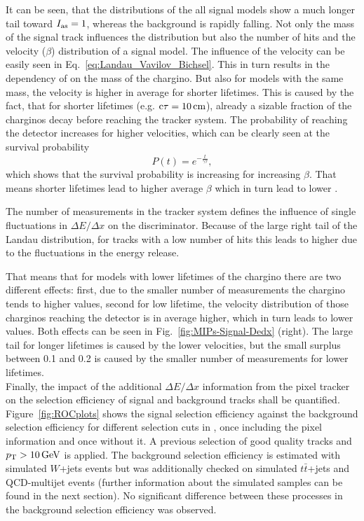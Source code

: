 It can be seen, that the \ias distributions of the all signal models show a much longer tail toward $I_{\text{as}}=1$, whereas the background is rapidly falling.
Not only the mass of the signal track influences the \ias distribution but also the number of hits and the velocity ($\beta$) distribution of a signal model.
The influence of the velocity can be easily seen in Eq.~\ref{eq:Landau_Vavilov_Bichsel}. 
This in turn results in the dependency of \ias on the mass of the chargino.
But also for models with the same mass, the velocity is higher in average for shorter lifetimes.
This is caused by the fact, that for shorter lifetimes (e.g. $\text{c}\tau=10\,\text{cm}$), already a sizable fraction of the charginos decay before reaching the tracker system.
The probability of reaching the detector increases for higher velocities, which can be clearly seen at the survival probability
\begin{equation}
P \left( t \right) = e^{-\frac{t}{\gamma \tau}},
\end{equation} 
which shows that the survival probability is increasing for increasing $\beta$. 
That means shorter lifetimes lead to higher average $\beta$ which in turn lead to lower \ias.

The number of measurements in the tracker system defines the influence of single fluctuations in $\Delta E/\Delta x$ on the \ias discriminator. 
Because of the large right tail of the Landau distribution, for tracks with a low number of hits this leads to higher \ias due to the  fluctuations in the energy release.

That means that for models with lower lifetimes of the chargino there are two different effects: 
first, due to the smaller number of measurements the chargino tends to higher \ias values, 
second for low lifetime, the velocity distribution of those charginos reaching the detector is in average higher, which in turn leads to lower  \ias values.
Both effects can be seen in Fig.~\ref{fig:MIPs-Signal-Dedx} (right).
The large tail for longer lifetimes is caused by the lower velocities, but the small surplus between 0.1 and 0.2 is caused by the smaller number of measurements for lower lifetimes.\\


Finally, the impact of the additional $\Delta E/\Delta x$ information from the pixel tracker on the selection efficiency of signal and background tracks shall be quantified.
Figure~\ref{fig:ROCplots} shows the signal selection efficiency against the background selection efficiency for different selection cuts in \ias, once including the pixel information and once without it.
A previous selection of good quality tracks and $p_{\text{T}}>10\,\text{Ge}\kern-0.06667em\text{V}$ is applied.
The background selection efficiency is estimated with simulated $W$+jets  events but was additionally checked on simulated $t\bar{t}$+jets  and QCD-multijet events 
(further information about the simulated samples can be found in the next section).
No significant difference between these processes in the background selection efficiency was observed.

